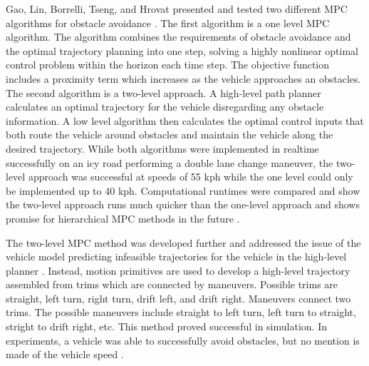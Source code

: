 \documentclass[12pt,onecolumn]{article}
\begin{document}
Gao, Lin, Borrelli, Tseng, and Hrovat presented and tested two different MPC algorithms for obstacle avoidance \cite{Gao&Borrelli2010}. The first algorithm is a one level MPC algorithm. The algorithm combines the requirements of obstacle avoidance and the optimal trajectory planning into one step, solving a highly nonlinear optimal control problem within the horizon each time step. The objective function includes a proximity term which increases as the vehicle approaches an obstacles. The second algorithm is a two-level approach. A high-level path planner calculates an optimal trajectory for the vehicle disregarding any obstacle information. A low level algorithm then calculates the optimal control inputs that both route the vehicle around obstacles and maintain the vehicle along the desired trajectory. While both algorithms were implemented in realtime successfully on an icy road performing a double lane change maneuver, the two-level approach was successful at speeds of 55 kph while the one level could only be implemented up to 40 kph. Computational runtimes were compared and show the two-level approach runs much quicker than the one-level approach and shows promise for hierarchical MPC methods in the future \cite{Gao&Borrelli2010}.

The two-level MPC method was developed further and addressed the issue of the vehicle model predicting infeasible trajectories for the vehicle in the high-level planner \cite{Gray&Gao2012}. Instead, motion primitives are used to develop a high-level trajectory assembled from trims which are connected by maneuvers. Possible trims are straight, left turn, right turn, drift left, and drift right. Maneuvers connect two trims. The possible maneuvers include straight to left turn, left turn to straight, stright to drift right, etc. This method proved successful in simulation. In experiments, a vehicle was able to successfully avoid obstacles, but no mention is made of the vehicle speed \cite{Gray&Gao2012}.
\end{document}
